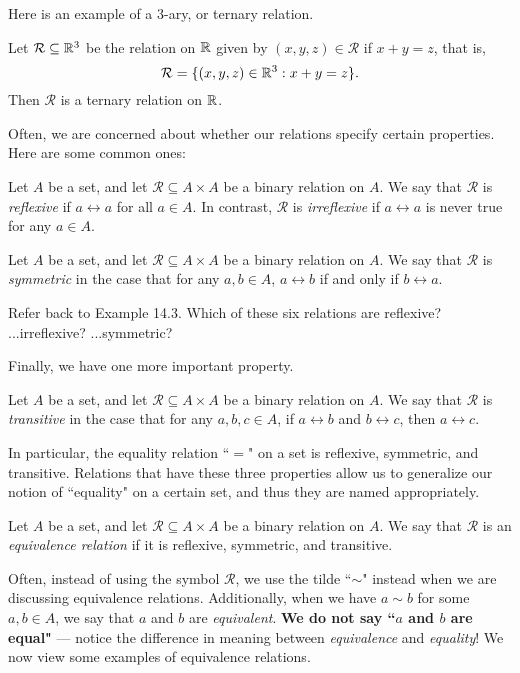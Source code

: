 \documentclass{article}
\begin{document}
Here is an example of a $3$-ary, or ternary relation.
\begin{example}
Let $\mathcal R \subseteq \mathbb R^3$ be the relation on $\mathbb R$ given by $(x,y,z)\in\mathcal R$ if $x+y = z$, that is,
$$\mathcal R = \{(x,y,z)\in\mathbb R^3: x + y  = z\}.$$
Then $\mathcal R$ is a ternary relation on $\mathbb R$.
\end{example}

Often, we are concerned about whether our relations specify certain properties. Here are some common ones:
\begin{definition}
Let $A$ be a set, and let $\mathcal R\subseteq A\times A$ be a binary relation on $A$. We say that $\mathcal R$ is \textit{reflexive} if $a\rel a$ for all $a\in A$. In contrast, $\mathcal R$ is \textit{irreflexive} if $a\rel a$ is never true for any $a\in A$.
\end{definition}
\begin{definition}
Let $A$ be a set, and let $\mathcal R\subseteq A\times A$ be a binary relation on $A$. We say that $\mathcal R$ is \textit{symmetric} in the case that for any $a,b\in A$, $a\rel b$ if and only if $b\rel a$.
\end{definition}
\begin{exercise}
Refer back to Example 14.3. Which of these six relations are reflexive? ...irreflexive? ...symmetric?
\end{exercise}

Finally, we have one more important property.
\begin{definition}
Let $A$ be a set, and let $\mathcal R\subseteq A\times A$ be a binary relation on $A$. We say that $\mathcal R$ is \textit{transitive} in the case that for any $a,b,c\in A$, if $a\rel b$ and $b\rel c$, then $a\rel c$.
\end{definition}

In particular, the equality relation ``$=$" on a set is reflexive, symmetric, and transitive. Relations that have these three properties allow us to generalize our notion of ``equality" on a certain set, and thus they are named appropriately.

\begin{definition}
Let $A$ be a set, and let $\mathcal R\subseteq A\times A$ be a binary relation on $A$. We say that $\mathcal R$ is an \textit{equivalence relation} if it is reflexive, symmetric, and transitive.
\end{definition}

Often, instead of using the symbol $\mathcal R$, we use the tilde ``$\sim$" instead when we are discussing equivalence relations. Additionally, when we have $a\sim b$ for some $a,b\in A$, we say that $a$ and $b$ are \textit{equivalent}. \textbf{We do not say ``$a$ and $b$ are equal"} --- notice the difference in meaning between \textit{equivalence} and \textit{equality}! We now view some examples of equivalence relations.
\end{document}
